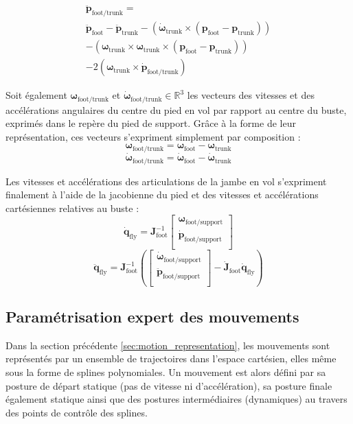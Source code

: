 \begin{gather*}
    \bm{\ddot{p}}_{\text{foot/trunk}} = \\
    \bm{\ddot{p}}_{\text{foot}} 
    - \bm{\ddot{p}}_{\text{trunk}}
    - \left(\bm{\dot{\omega}}_{\text{trunk}} \times (\bm{p}_{\text{foot}}-\bm{p}_{\text{trunk}})\right) \\
    - \left(\bm{\omega}_{\text{trunk}} \times \bm{\omega}_{\text{trunk}} \times (\bm{p}_{\text{foot}}-\bm{p}_{\text{trunk}})\right) \\
    - 2\left(\bm{\omega}_{\text{trunk}} \times \bm{\dot{p}}_{\text{foot/trunk}}\right)
\end{gather*}

Soit également $\bm{\omega}_{\text{foot/trunk}}$ et $\bm{\dot{\omega}}_{\text{foot/trunk}} \in \mathbb{R}^3$
les vecteurs des vitesses et des accélérations angulaires du centre du pied en vol 
par rapport au centre du buste, exprimés dans le repère du pied de support.
Grâce à la forme de leur représentation, ces vecteurs s'expriment simplement par composition :
$$
\bm{\omega}_{\text{foot/trunk}} = \bm{\omega}_{\text{foot}} - \bm{\omega}_{\text{trunk}}
$$
$$
\bm{\dot{\omega}}_{\text{foot/trunk}} = \bm{\dot{\omega}}_{\text{foot}} - \bm{\dot{\omega}}_{\text{trunk}}
$$

Les vitesses et accélérations des articulations de la jambe en vol
s'expriment finalement à l'aide de la jacobienne du pied et des vitesses
et accélérations cartésiennes relatives au buste :
$$
\dot{\bm{q}}_{\text{fly}} = \bm{J}_{\text{foot}}^{-1}
\begin{bmatrix}
    \bm{\omega}_{\text{foot/support}} \\
    \bm{\dot{p}}_{\text{foot/support}} \\
\end{bmatrix}
$$
$$
\ddot{\bm{q}}_{\text{fly}} = \bm{J}_{\text{foot}}^{-1}\left(
\begin{bmatrix}
    \bm{\dot{\omega}}_{\text{foot/support}} \\
    \bm{\ddot{p}}_{\text{foot/support}} \\
\end{bmatrix}
-
\bm{\dot{J}}_{\text{foot}}\dot{\bm{q}}_{\text{fly}}
\right)
$$

\subsection{Paramétrisation expert des mouvements\label{sec:motion_template}}

Dans la section précédente \ref{sec:motion_representation}, 
les mouvements sont représentés par un ensemble de trajectoires
dans l'espace cartésien, elles même sous la forme de splines polynomiales.
Un mouvement est alors défini par sa posture de départ statique (pas de vitesse
ni d'accélération), sa posture finale également statique ainsi que des postures 
intermédiaires (dynamiques) au travers des points de contrôle des splines.

